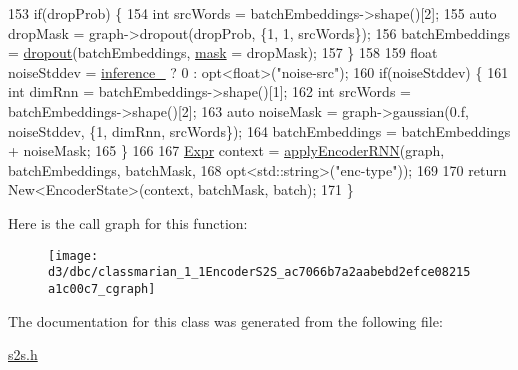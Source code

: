 \begin{DoxyCode}
153     \textcolor{keywordflow}{if}(dropProb) \{
154       \textcolor{keywordtype}{int} srcWords = batchEmbeddings->shape()[2];
155       \textcolor{keyword}{auto} dropMask = graph->dropout(dropProb, \{1, 1, srcWords\});
156       batchEmbeddings = \hyperlink{namespacemarian_a268400392f22176821c7c4a36733b178}{dropout}(batchEmbeddings, \hyperlink{namespacemarian_1_1keywords_a201bea6bea8108889b63081132cc3cd7}{mask} = dropMask);
157     \}
158 
159     \textcolor{keywordtype}{float} noiseStddev = \hyperlink{classmarian_1_1EncoderBase_a3543e255f5547f556c6ba30220ee2f2c}{inference\_} ? 0 : opt<float>(\textcolor{stringliteral}{"noise-src"});
160     \textcolor{keywordflow}{if}(noiseStddev) \{
161       \textcolor{keywordtype}{int} dimRnn = batchEmbeddings->shape()[1];
162       \textcolor{keywordtype}{int} srcWords = batchEmbeddings->shape()[2];
163       \textcolor{keyword}{auto} noiseMask = graph->gaussian(0.f, noiseStddev, \{1, dimRnn, srcWords\});
164       batchEmbeddings = batchEmbeddings + noiseMask;
165     \}
166 
167     \hyperlink{namespacemarian_a498d8baf75b754011078b890b39c8e12}{Expr} context = \hyperlink{classmarian_1_1EncoderS2S_a4c184957715cc7cfa910be04396b3f01}{applyEncoderRNN}(graph, batchEmbeddings, batchMask,
168                                    opt<std::string>(\textcolor{stringliteral}{"enc-type"}));
169 
170     \textcolor{keywordflow}{return} New<EncoderState>(context, batchMask, batch);
171   \}
\end{DoxyCode}


Here is the call graph for this function\+:
\nopagebreak
\begin{figure}[H]
\begin{center}
\leavevmode
\texttt{[image: d3/dbc/classmarian\_1\_1EncoderS2S\_ac7066b7a2aabebd2efce08215a1c00c7\_cgraph]}
\end{center}
\end{figure}




The documentation for this class was generated from the following file\+:\begin{DoxyCompactItemize}
\item 
\hyperlink{s2s_8h}{s2s.\+h}\end{DoxyCompactItemize}
